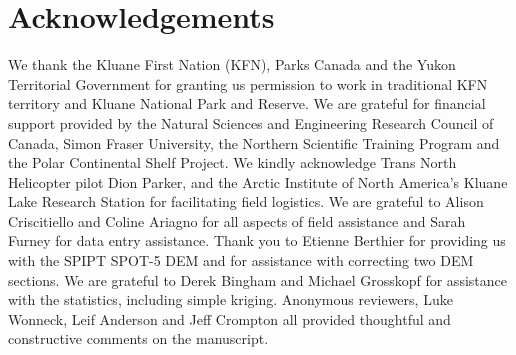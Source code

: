 \documentclass[twocolumn, letterpaper]{igs}
\begin{document}
\section{Acknowledgements}

We thank the Kluane First Nation (KFN), Parks Canada and the Yukon Territorial Government for granting us permission to work in traditional KFN territory and Kluane National Park and Reserve. We are grateful for financial support provided by the Natural Sciences and Engineering Research Council of  Canada, Simon Fraser University, the Northern Scientific  Training  Program and the Polar Continental Shelf Project. We kindly acknowledge Trans North Helicopter pilot Dion Parker, and the Arctic Institute of North America's Kluane Lake Research Station for facilitating field logistics. We are grateful to Alison Criscitiello and Coline Ariagno for all aspects of field assistance and Sarah Furney for data entry assistance. Thank you to Etienne Berthier for providing us with the SPIPT SPOT-5 DEM and for assistance with correcting two DEM sections. We are grateful to Derek Bingham and Michael Grosskopf for assistance with the statistics, including simple kriging. Anonymous reviewers, Luke Wonneck, Leif Anderson and Jeff Crompton all provided
thoughtful and constructive comments on the
manuscript.


%

%
%


\end{document}
